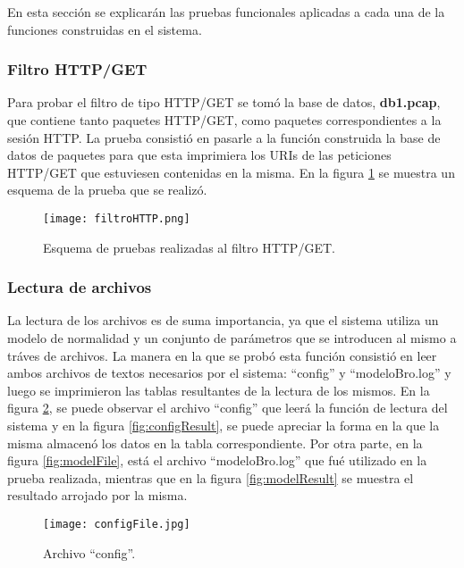 En esta sección se explicarán las pruebas funcionales aplicadas a cada
una de la funciones construidas en el sistema.

\subsubsection{Filtro HTTP/GET}

Para probar el filtro de tipo HTTP/GET se tomó la base de datos,
\textbf{db1.pcap}, que contiene tanto paquetes HTTP/GET, como paquetes correspondientes a la sesión HTTP. La prueba consistió en pasarle a la función construida la base de datos de paquetes para que esta imprimiera los URIs de las peticiones HTTP/GET que estuviesen contenidas en la misma. En la
figura \ref{fig:filtroHTTP} se muestra un esquema de la prueba que se realizó.

\begin{figure}[tb]
\begin{center}
\texttt{[image: filtroHTTP.png]}
\caption{Esquema de pruebas realizadas al filtro HTTP/GET.}
\label{fig:filtroHTTP}
\end{center}
\end{figure}

\subsubsection{Lectura de archivos}

La lectura de los archivos es de suma importancia, ya que el sistema utiliza un modelo de normalidad y un conjunto de parámetros que se introducen
al mismo a tráves de archivos.
La manera en la que se probó esta función consistió en leer ambos archivos de textos necesarios por el sistema: ``config'' y ``modeloBro.log'' y luego se imprimieron las tablas resultantes de la lectura de los mismos.
En la figura \ref{fig:configFile}, se puede observar el archivo ``config'' que leerá la función de lectura del sistema y en la figura \ref{fig:configResult}, se puede apreciar la forma en la
que la misma almacenó los datos en la tabla correspondiente.
Por otra parte, en la figura \ref{fig:modelFile}, está el archivo ``modeloBro.log'' que fué utilizado en la prueba realizada, mientras que en la figura \ref{fig:modelResult} se muestra el resultado arrojado por la misma.

\begin{figure}[tb]
\begin{center}
\texttt{[image: configFile.jpg]}
\caption{Archivo ``config''.}
\label{fig:configFile}
\end{center}
\end{figure}

